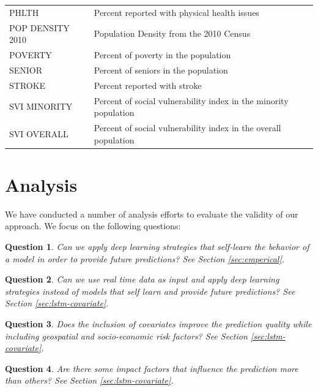 \documentclass[a4paper, inpress]{jds} %
\renewcommand{\_}{%
    \textunderscore\hspace{0pt}%
}
\newtheorem{question}{Question}
\begin{document}
\begin{table}[!hptb]
{\begin{tabular}{ll}
 PHLTH        & Percent reported with physical health issues\\
 POP\_DENSITY\_2010 & Population Density from the 2010 Census\\
 POVERTY & Percent of poverty in the population\\
 SENIOR  & Percent of seniors in the population\\
 STROKE 	  & Percent reported with stroke\\
 SVI\_MINORITY 	  & Percent of social vulnerability index in the minority population\\
 SVI\_OVERALL 	  & Percent of social vulnerability index in the overall population\\
\bottomrule
\end{tabular}
}
\end{table}


\section{Analysis}

We have conducted a number of analysis efforts to evaluate the
validity of our approach. We focus on the following questions:

\begin{question} \normalfont Can we apply deep learning strategies
  that self-learn the behavior of a model in order to provide future
  predictions? See Section \ref{sec:emperical}.
\label{q:1}
\end{question}

\begin{question} \normalfont Can we use real time data as input and
  apply deep learning strategies instead of models that self learn and
  provide future predictions? See Section \ref{sec:lstm-covariate}.
\label{q:2}
\end{question}

\begin{question} \normalfont Does the inclusion of covariates improve
  the prediction quality while including geospatial and socio-economic
  risk factors? See Section \ref{sec:lstm-covariate}.
\label{q:3}
\end{question}

\begin{question} \normalfont Are there some impact factors that
  influence the prediction more than others? See Section
  \ref{sec:lstm-covariate}.
\label{q:4}
\end{question}
\end{document}
